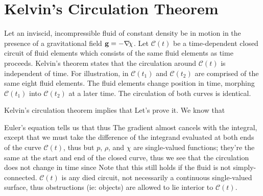 \documentclass[12pt]{book}
\begin{document}
\section{Kelvin's Circulation Theorem}\label{2103470129384198236410928364918207412}

Let an inviscid, incompressible fluid of constant density be in motion in the presence of a gravitational field $\vec g = -\grad\chi$.  Let $\mathcal C(t)$ be a time-dependent closed circuit of fluid elements which consists of the same fluid elements as time proceeds.  Kelvin's theorem states that the circulation
around $\mathcal C(t)$ is independent of time.  For illustration, in  $\mathcal C(t_1)$ and $\mathcal C(t_2)$ are comprised of the same eight fluid elements.  The fluid elements change position in time, morphing $\mathcal C(t_1)$ into  $\mathcal C(t_2)$ at a later time.  The circulation of both curves is identical.

Kelvin's circulation theorem implies that  Let's prove it.  We know that


Euler's equation tells us that 
thus
The gradient almost cancels with the integral, except that we must take the difference of the integrand evaluated at both ends of the curve $\mathcal C(t)$, thus
but $p$, $\rho$, and $\chi$ are single-valued functions; they're the same at the start and end of the closed curve, thus we see that the circulation does not change in time since
  Note that this still holds if the fluid is not simply-connected.  $\mathcal C(t)$ is any died circuit, not necessarily a continuous single-valued surface, thus obstructions (ie: objects) are allowed to lie interior to $\mathcal C(t)$.
\end{document}

